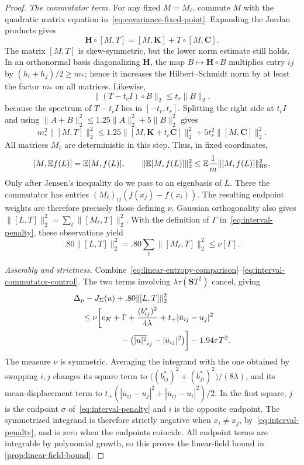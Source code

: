 \begin{proof}
\smallskip\noindent\emph{The commutator term.} For any fixed $M=M_\ell$, commute $M$ with the quadratic matrix equation in~\eqref{eq:covariance-fixed-point}.  Expanding the Jordan products gives
\[
 \mathbf{H}\circ[M,T]=[M,\mathbf{K}]+T\circ[M,\mathbf{C}].
\]
The matrix $[M,T]$ is skew-symmetric, but the lower norm estimate still holds.  In an orthonormal basis diagonalizing $\mathbf{H}$, the map $B\mapsto\mathbf{H}\circ B$ multiplies entry $ij$ by $(h_i+h_j)/2\ge m_*$; hence it increases the Hilbert--Schmidt norm by at least the factor $m_*$ on all matrices.  Likewise,
\[
 \|(T-t_cI)\circ B\|_2\le t_r\|B\|_2,
\]
because the spectrum of $T-t_cI$ lies in $[-t_r,t_r]$. Splitting the right side at $t_cI$ and using $\|A+B\|_2^2\le1.25\|A\|_2^2+5\|B\|_2^2$ gives
\[
 m_*^2\|[M,T]\|_2^2
 \le1.25\|[M,\mathbf{K}+t_c\mathbf{C}]\|_2^2
       +5t_r^2\|[M,\mathbf{C}]\|_2^2.
\]
All matrices $M_\ell$ are deterministic in this step.  Thus, in fixed coordinates,
\[
 [M,\mathbb{E} f(L)]=\mathbb{E}[M,f(L)],
 \qquad
 \|\mathbb{E}[M,f(L)]\|_2^2
      \le\mathbb{E}\frac1m\|[M,f(L)]\|_{\rm HS}^2.
\]
Only after Jensen's inequality do we pass to an eigenbasis of $L$. There the commutator has entries $(M_\ell)_{ij}(f(x_j)-f(x_i))$.  The resulting endpoint weights are therefore precisely those defining $\nu$.  Gaussian orthogonality also gives $\|[L,T]\|_2^2=\sum_\ell\|[M_\ell,T]\|_2^2$. With the definition of $\Gamma$ in~\eqref{eq:interval-penalty}, these observations yield
\begin{equation}
 .80\|[L,T]\|_2^2
       =.80\sum_\ell\|[M_\ell,T]\|_2^2\le\nu[\Gamma].
 \label{eq:interval-commutator-control}
\end{equation}

\smallskip\noindent\emph{Assembly and strictness.} Combine~\eqref{eq:linear-entropy-comparison}--\eqref{eq:interval-commutator-control}.  The two terms involving $\lambda\tau(\mathbf{S} T^2)$ cancel, giving
\[
 \begin{aligned}
 &\Delta_{\rm p}-J_\Sigma(u)+.80\|[L,T]\|_2^2\\
 &\quad\le\nu\biggl[e_K+\Gamma
       +\frac{(b_{ij}^*)^2}{4\lambda}
       +t_+|\bar u_{ij}-u_j|^2\\
 &\hspace{20mm}
       -\bigl(\overline{|u|^2}_{ij}-|\bar u_{ij}|^2\bigr)\biggr]
       -1.94\tau T^2.
 \end{aligned}
\]
The measure $\nu$ is symmetric.  Averaging the integrand with the one obtained by swapping $i,j$ changes its square term to $\bigl((b_{ij}^*)^2+(b_{ji}^*)^2\bigr)/(8\lambda)$, and its mean-displacement term to $t_+(|\bar u_{ij}-u_j|^2+|\bar u_{ij}-u_i|^2)/2$. In the first square, $j$ is the endpoint $\sigma$ of~\eqref{eq:interval-penalty} and $i$ is the opposite endpoint.  The symmetrized integrand is therefore strictly negative when $x_i\ne x_j$, by~\eqref{eq:interval-penalty}, and is zero when the endpoints coincide.  All endpoint terms are integrable by polynomial growth, so this proves the linear-field bound in \cref{prop:linear-field-bound}.


\end{proof}
